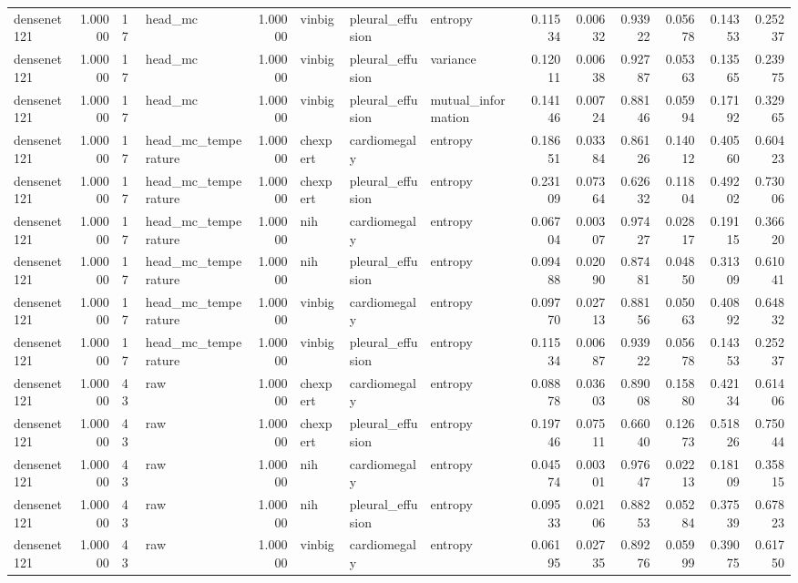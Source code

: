 \begin{tabular}{lrllrlllrrrrrr}
densenet121 & 1.00000 & 17 & head\_mc & 1.00000 & vinbig & pleural\_effusion & entropy & 0.11534 & 0.00632 & 0.93922 & 0.05678 & 0.14353 & 0.25237 \\
densenet121 & 1.00000 & 17 & head\_mc & 1.00000 & vinbig & pleural\_effusion & variance & 0.12011 & 0.00638 & 0.92787 & 0.05363 & 0.13565 & 0.23975 \\
densenet121 & 1.00000 & 17 & head\_mc & 1.00000 & vinbig & pleural\_effusion & mutual\_information & 0.14146 & 0.00724 & 0.88146 & 0.05994 & 0.17192 & 0.32965 \\
densenet121 & 1.00000 & 17 & head\_mc\_temperature & 1.00000 & chexpert & cardiomegaly & entropy & 0.18651 & 0.03384 & 0.86126 & 0.14012 & 0.40560 & 0.60423 \\
densenet121 & 1.00000 & 17 & head\_mc\_temperature & 1.00000 & chexpert & pleural\_effusion & entropy & 0.23109 & 0.07364 & 0.62632 & 0.11804 & 0.49202 & 0.73006 \\
densenet121 & 1.00000 & 17 & head\_mc\_temperature & 1.00000 & nih & cardiomegaly & entropy & 0.06704 & 0.00307 & 0.97427 & 0.02817 & 0.19115 & 0.36620 \\
densenet121 & 1.00000 & 17 & head\_mc\_temperature & 1.00000 & nih & pleural\_effusion & entropy & 0.09488 & 0.02090 & 0.87481 & 0.04850 & 0.31309 & 0.61041 \\
densenet121 & 1.00000 & 17 & head\_mc\_temperature & 1.00000 & vinbig & cardiomegaly & entropy & 0.09770 & 0.02713 & 0.88156 & 0.05063 & 0.40892 & 0.64832 \\
densenet121 & 1.00000 & 17 & head\_mc\_temperature & 1.00000 & vinbig & pleural\_effusion & entropy & 0.11534 & 0.00687 & 0.93922 & 0.05678 & 0.14353 & 0.25237 \\
densenet121 & 1.00000 & 43 & raw & 1.00000 & chexpert & cardiomegaly & entropy & 0.08878 & 0.03603 & 0.89008 & 0.15880 & 0.42134 & 0.61406 \\
densenet121 & 1.00000 & 43 & raw & 1.00000 & chexpert & pleural\_effusion & entropy & 0.19746 & 0.07511 & 0.66040 & 0.12673 & 0.51826 & 0.75044 \\
densenet121 & 1.00000 & 43 & raw & 1.00000 & nih & cardiomegaly & entropy & 0.04574 & 0.00301 & 0.97647 & 0.02213 & 0.18109 & 0.35815 \\
densenet121 & 1.00000 & 43 & raw & 1.00000 & nih & pleural\_effusion & entropy & 0.09533 & 0.02106 & 0.88253 & 0.05284 & 0.37539 & 0.67823 \\
densenet121 & 1.00000 & 43 & raw & 1.00000 & vinbig & cardiomegaly & entropy & 0.06195 & 0.02735 & 0.89276 & 0.05999 & 0.39075 & 0.61750 \\

\end{tabular}
